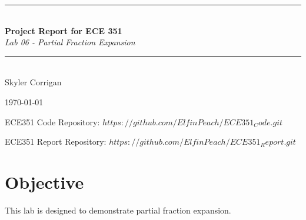 \documentclass[12pt,a4paper]{article}
\newcommand{\HRule}{\rule{\linewidth}{0.5mm}}
\begin{document}
\begin{titlepage}
\begin{center}



\HRule \\[0.4cm]
{ \LARGE 
  \textbf{Project Report for ECE 351}\\[0.4cm]
  \emph{Lab 06 - Partial Fraction Expansion}\\[0.4cm]
}
\HRule \\[1.5cm]



{ \large
  Skyler Corrigan \\[0.1cm]
}

\vfill



{\large \today}

{ \large
ECE351 Code Repository: 
\hyperlink{$https://github.com/ElfinPeach/ECE351_Code.git$}{$https://github.com/ElfinPeach/ECE351_Code.git$}

ECE351 Report Repository: 
\hyperlink{$https://github.com/ElfinPeach/ECE351_Report.git$}{$https://github.com/ElfinPeach/ECE351_Report.git$}
}
 
\end{center}
\end{titlepage}


\newpage



\tableofcontents
{}
\newpage
\setcounter{page}{1}

\section{Objective}
This lab is designed to demonstrate partial fraction expansion.\\
\end{document}
